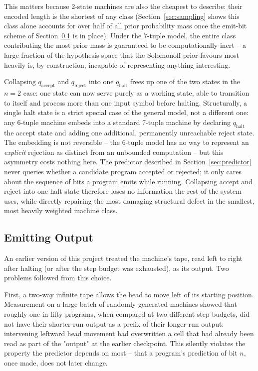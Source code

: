 \documentclass[11pt]{article}
\begin{document}
This matters because 2-state machines are also the cheapest to describe: their encoded
length is the shortest of any class (Section~\ref{sec:sampling} shows this class alone
accounts for over half of all prior probability mass once the emit-bit scheme of
Section~\ref{sec:emission} is in place). Under the 7-tuple model, the entire class
contributing the most prior mass is guaranteed to be computationally inert -- a large
fraction of the hypothesis space that the Solomonoff prior favours most heavily is, by
construction, incapable of representing anything interesting.

Collapsing $q_{\text{accept}}$ and $q_{\text{reject}}$ into one $q_{\text{halt}}$ frees up
one of the two states in the $n=2$ case: one state can now serve purely as a working state,
able to transition to itself and process more than one input symbol before halting.
Structurally, a single halt state is a strict special case of the general model, not a
different one: any 6-tuple machine embeds into a standard 7-tuple machine by declaring
$q_{\text{halt}}$ the accept state and adding one additional, permanently unreachable
reject state. The embedding is not reversible -- the 6-tuple model has no way to represent
an \emph{explicit} rejection as distinct from an unbounded computation -- but this
asymmetry costs nothing here. The predictor described in Section~\ref{sec:predictor} never
queries whether a candidate program accepted or rejected; it only cares about the sequence
of bits a program emits while running. Collapsing accept and reject into one halt state
therefore loses no information the rest of the system uses, while directly repairing the
most damaging structural defect in the smallest, most heavily weighted machine class.

\subsection{Emitting Output}
\label{sec:emission}

An earlier version of this project treated the machine's tape, read left to right after
halting (or after the step budget was exhausted), as its output. Two problems followed
from this choice.

First, a two-way infinite tape allows the head to move left of its starting position.
Measurement on a large batch of randomly generated machines showed that roughly one in
fifty programs, when compared at two different step budgets, did not have their shorter-run
output as a prefix of their longer-run output: intervening leftward head movement had
overwritten a cell that had already been read as part of the "output" at the earlier
checkpoint. This silently violates the property the predictor depends on most -- that a
program's prediction of bit $n$, once made, does not later change.
\end{document}
